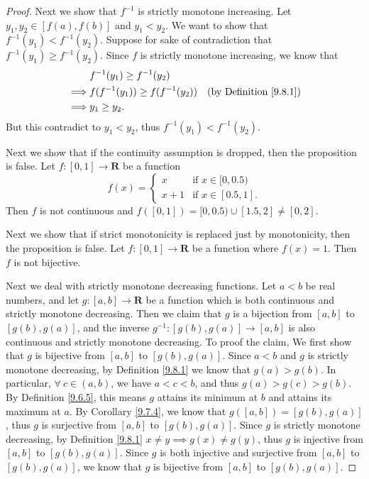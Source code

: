 \begin{proof}
    Next we show that \(f^{-1}\) is strictly monotone increasing.
    Let \(y_1, y_2 \in [f(a), f(b)]\) and \(y_1 < y_2\).
    We want to show that \(f^{-1}(y_1) < f^{-1}(y_2)\).
    Suppose for sake of contradiction that \(f^{-1}(y_1) \geq f^{-1}(y_2)\).
    Since \(f\) is strictly monotone increasing, we know that
    \begin{align*}
        & f^{-1}(y_1) \geq f^{-1}(y_2) \\
        \implies & f(f^{-1}(y_1)) \geq f(f^{-1}(y_2)) & \text{(by Definition \ref{9.8.1})} \\
        \implies & y_1 \geq y_2.
    \end{align*}
    But this contradict to \(y_1 < y_2\), thus \(f^{-1}(y_1) < f^{-1}(y_2)\).

    Next we show that if the continuity assumption is dropped, then the proposition is false.
    Let \(f : [0, 1] \to \mathbf{R}\) be a function
    \[
        f(x) = \begin{cases}
            x & \text{if } x \in [0, 0.5) \\
            x + 1 & \text{if } x \in [0.5, 1].
        \end{cases}
    \]
    Then \(f\) is not continuous and \(f([0, 1]) = [0, 0.5) \cup [1.5, 2] \neq [0, 2]\).

    Next we show that if strict monotonicity is replaced just by monotonicity, then the proposition is false.
    Let \(f : [0, 1] \to \mathbf{R}\) be a function where \(f(x) = 1\).
    Then \(f\) is not bijective.

    Next we deal with strictly monotone decreasing functions.
    Let \(a < b\) be real numbers, and let \(g : [a, b] \to \mathbf{R}\) be a function which is both continuous and strictly monotone decreasing.
    Then we claim that \(g\) is a bijection from \([a, b]\) to \([g(b), g(a)]\), and the inverse \(g^{-1} : [g(b), g(a)] \to [a, b]\) is also continuous and strictly monotone decreasing.
    To proof the claim, We first show that \(g\) is bijective from \([a, b]\) to \([g(b), g(a)]\).
    Since \(a < b\) and \(g\) is strictly monotone decreasing, by Definition \ref{9.8.1} we know that \(g(a) > g(b)\).
    In particular, \(\forall\ c \in (a, b)\), we have \(a < c < b\), and thus \(g(a) > g(c) > g(b)\).
    By Definition \ref{9.6.5}, this means \(g\) attains its minimum at \(b\) and attains its maximum at \(a\).
    By Corollary \ref{9.7.4}, we know that \(g([a, b]) = [g(b), g(a)]\), thus \(g\) is surjective from \([a, b]\) to \([g(b), g(a)]\).
    Since \(g\) is strictly monotone decreasing, by Definition \ref{9.8.1} \(x \neq y \implies g(x) \neq g(y)\), thus \(g\) is injective from \([a, b]\) to \([g(b), g(a)]\).
    Since \(g\) is both injective and surjective from \([a, b]\) to \([g(b), g(a)]\), we know that \(g\) is bijective from \([a, b]\) to \([g(b), g(a)]\).


\end{proof}
